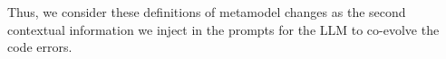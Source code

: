 Thus, we consider these definitions of metamodel changes as the second contextual information we inject in the prompts for the LLM to co-evolve the code errors. 



